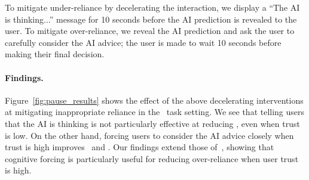 To mitigate under-reliance by decelerating the interaction, we display a ``The AI is thinking...'' message for 10 seconds before the AI prediction is revealed to the user. 
To mitigate over-reliance, we reveal the AI prediction and ask the user to carefully consider the AI advice; the user is made to wait 10 seconds before making their final decision. 

\paragraph{Findings.} Figure~\ref{fig:pause_results} shows the effect of the above decelerating interventions at mitigating inappropriate reliance in the \arcc\ task setting. 
We see that telling users that the AI is thinking is not particularly effective at reducing \totalinapprel, even when trust is low. 
On the other hand, forcing users to consider the AI advice closely when trust is high improves \totalinapprel\ and \finalacc. 
Our findings extend those of~\citet{buccinca2021trust}, showing that cognitive forcing is particularly useful for reducing over-reliance when user trust is high.

